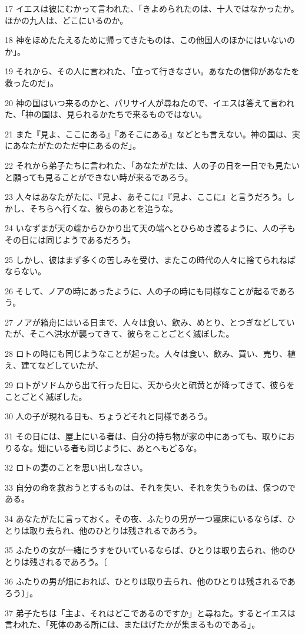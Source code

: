 \par 17 イエスは彼にむかって言われた、「きよめられたのは、十人ではなかったか。ほかの九人は、どこにいるのか。
\par 18 神をほめたたえるために帰ってきたものは、この他国人のほかにはいないのか」。
\par 19 それから、その人に言われた、「立って行きなさい。あなたの信仰があなたを救ったのだ」。
\par 20 神の国はいつ来るのかと、パリサイ人が尋ねたので、イエスは答えて言われた、「神の国は、見られるかたちで来るものではない。
\par 21 また『見よ、ここにある』『あそこにある』などとも言えない。神の国は、実にあなたがたのただ中にあるのだ」。
\par 22 それから弟子たちに言われた、「あなたがたは、人の子の日を一日でも見たいと願っても見ることができない時が来るであろう。
\par 23 人々はあなたがたに、『見よ、あそこに』『見よ、ここに』と言うだろう。しかし、そちらへ行くな、彼らのあとを追うな。
\par 24 いなずまが天の端からひかり出て天の端へとひらめき渡るように、人の子もその日には同じようであるだろう。
\par 25 しかし、彼はまず多くの苦しみを受け、またこの時代の人々に捨てられねばならない。
\par 26 そして、ノアの時にあったように、人の子の時にも同様なことが起るであろう。
\par 27 ノアが箱舟にはいる日まで、人々は食い、飲み、めとり、とつぎなどしていたが、そこへ洪水が襲ってきて、彼らをことごとく滅ぼした。
\par 28 ロトの時にも同じようなことが起った。人々は食い、飲み、買い、売り、植え、建てなどしていたが、
\par 29 ロトがソドムから出て行った日に、天から火と硫黄とが降ってきて、彼らをことごとく滅ぼした。
\par 30 人の子が現れる日も、ちょうどそれと同様であろう。
\par 31 その日には、屋上にいる者は、自分の持ち物が家の中にあっても、取りにおりるな。畑にいる者も同じように、あとへもどるな。
\par 32 ロトの妻のことを思い出しなさい。
\par 33 自分の命を救おうとするものは、それを失い、それを失うものは、保つのである。
\par 34 あなたがたに言っておく。その夜、ふたりの男が一つ寝床にいるならば、ひとりは取り去られ、他のひとりは残されるであろう。
\par 35 ふたりの女が一緒にうすをひいているならば、ひとりは取り去られ、他のひとりは残されるであろう。〔
\par 36 ふたりの男が畑におれば、ひとりは取り去られ、他のひとりは残されるであろう〕」。
\par 37 弟子たちは「主よ、それはどこであるのですか」と尋ねた。するとイエスは言われた、「死体のある所には、またはげたかが集まるものである」。

